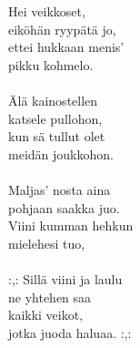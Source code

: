 
            Hei veikkoset, \\
            eiköhän ryypätä jo, \\
            ettei hukkaan menis' \\
            pikku kohmelo. \\
\hspace{10mm} \\
            Älä kainostellen \\
            katsele pullohon, \\
            kun sä tullut olet \\
            meidän joukkohon. \\
\hspace{10mm} \\
            Maljas' nosta aina \\
            pohjaan saakka juo. \\
            Viini kumman hehkun \\
            mielehesi tuo, \\
\hspace{10mm} \\
            :,: Sillä viini ja laulu \\
            ne yhtehen saa \\
            kaikki veikot, \\
            jotka juoda haluaa. :,: \\
